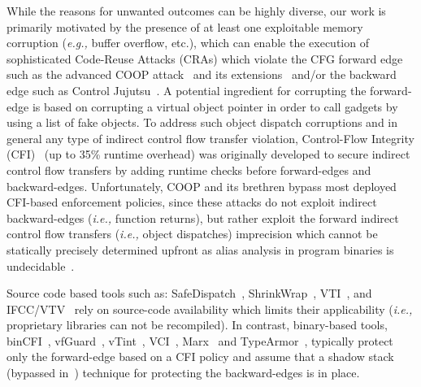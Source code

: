 While the reasons for unwanted outcomes can be highly diverse, our work is primarily motivated by the presence of at least one exploitable
memory corruption (\textit{e.g.,} buffer overflow, etc.), which can enable the execution of sophisticated Code-Reuse Attacks 
(CRAs) which violate the CFG forward edge such as the advanced COOP attack~\cite{schuster:coop} and its 
extensions~\cite{crane:readactor++, subversive-c:lettner, ctf:coop, loop:oriented} and/or the backward edge such as Control Jujutsu~\cite{jujutsu}. 
A potential ingredient for corrupting the forward-edge is based on corrupting a virtual object pointer in order to call gadgets by using a list of fake objects.
To address such object dispatch corruptions
and in general any type of indirect control flow transfer violation, Control-Flow Integrity (CFI)~\cite{abadi:cfi2, abadi:cfi} (up to 35\% runtime overhead)
was originally developed to secure indirect control flow transfers by adding runtime checks before forward-edges and backward-edges. Unfortunately, COOP and its brethren 
bypass most deployed CFI-based enforcement policies, since 
these attacks do not exploit indirect backward-edges (\textit{i.e.,} function returns), but rather exploit the forward indirect control flow transfers (\textit{i.e.,} object dispatches)
imprecision which cannot be statically precisely determined upfront as alias analysis in program binaries is undecidable~\cite{alias:undecidable}.

Source code based tools such as: SafeDispatch~\cite{safedispatch:jang}, 
ShrinkWrap~\cite{haller:shrinkwrap}, VTI~\cite{bounov:interleaving}, and IFCC/VTV~\cite{vtv:tice}
rely on source-code availability which limits their applicability (\textit{i.e.,} proprietary libraries can not be recompiled).
In contrast, binary-based tools, binCFI~\cite{ccfir:zhang, zhang:usenix}, vfGuard~\cite{vfuard:aravind}, 
vTint~\cite{vtint:zhang}, VCI~\cite{vci:asiaccs}, Marx~\cite{marx} and TypeArmor~\cite{veen:typearmor}, typically protect only the forward-edge based on a CFI 
policy and assume that a shadow stack~\cite{volodymyr:cpi} (bypassed in~\cite{safestack:bypassing}) technique for protecting the backward-edges is in place.

